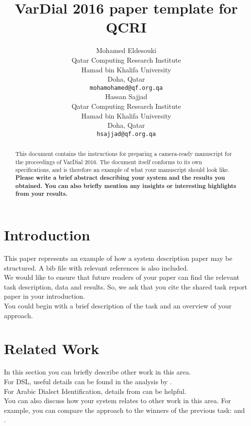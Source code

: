 \documentclass[11pt]{article}
\title{VarDial 2016 paper template for QCRI}
\author{Mohamed Eldesouki \\
  Qatar Computing Research Institute \\
  Hamad bin Khalifa University \\
  Doha, Qatar \\
  {\tt mohamohamed@qf.org.qa} \\\And
  Hassan Sajjad \\
  Qatar Computing Research Institute \\
  Hamad bin Khalifa University \\
  Doha, Qatar \\
  {\tt hsajjad@qf.org.qa} \\}
\date{}
\begin{document}
\maketitle
\begin{abstract}
  This document contains the instructions for preparing a camera-ready
  manuscript for the proceedings of VarDial 2016. The document itself
  conforms to its own specifications, and is therefore an example of
  what your manuscript should look like. \bf Please write a brief abstract describing your system and the results you obtained. You can also briefly mention any insights or interesting highlights from your results.
\end{abstract}

\section{Introduction}
\label{intro}
\cite{Ali+2016}
This paper represents an example of how a system description paper may be structured. A bib file with relevant references is also included.
\\

We would like to ensure that future readers of your paper can find the relevant task description, data and results. So, we ask that you cite the shared task report paper \cite{dsl2016} in your introduction.
\\

You could begin with a brief description of the task and an overview of your approach. 


\section{Related Work}

In this section you can briefly describe other work in this area.
\\

For DSL, useful details can be found in the analysis by .
\\

For Arabic Dialect Identification, details from  can be helpful.
\\

You can also discuss how your system relates to other work in this area. For example, you can compare the approach to the winners of the previous task: \cite{malmasi-dras:2015:LT4VarDial} and \cite{goutte-leger:2015:LT4VarDial}.
\end{document}
